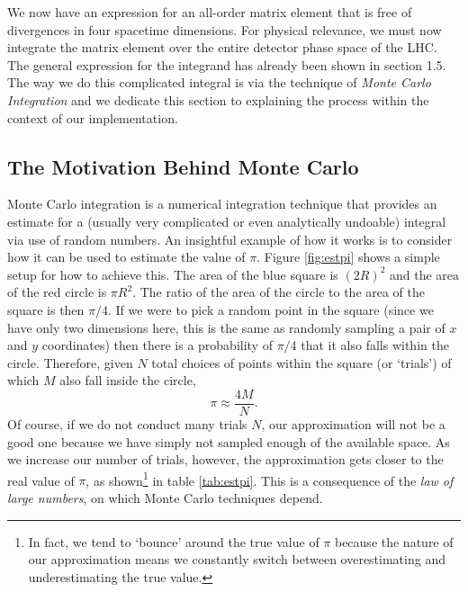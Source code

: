 We now have an expression for an all-order matrix element that is free of divergences in four spacetime dimensions. For physical relevance, we must now integrate the matrix element over the entire detector phase space of the LHC. The general expression for the integrand has already been shown in section 1.5. The way we do this complicated integral is via the technique of \emph{Monte Carlo Integration} and we dedicate this section to explaining the process within the context of our implementation.

\subsection{The Motivation Behind Monte Carlo}
Monte Carlo integration is a numerical integration technique that provides an estimate for a (usually very complicated or even analytically undoable) integral via use of random numbers. An insightful example of how it works is to consider how it can be used to estimate the value of $\pi$. Figure \ref{fig:estpi} shows a simple setup for how to achieve this. The area of the blue square is $(2R)^2$ and the area of the red circle is $\pi R^2$. The ratio of the area of the circle to the area of the square is then $\pi/4$. If we were to pick a random point in the square (since we have only two dimensions here, this is the same as randomly sampling a pair of $x$ and $y$ coordinates) then there is a probability of $\pi/4$ that it also falls within the circle. Therefore, given $N$ total choices of points within the square (or `trials') of which $M$ also fall inside the circle,
\begin{equation}
\pi \approx \frac{4M}{N}.
\end{equation} 
Of course, if we do not conduct many trials $N$, our approximation will not be a good one because we have simply not sampled enough of the available space. As we increase our number of trials, however, the approximation gets closer to the real value of $\pi$, as shown\footnote{In fact, we tend to `bounce' around the true value of $\pi$ because the nature of our approximation means we constantly switch between overestimating and underestimating the true value.} in table \ref{tab:estpi}. This is a consequence of the \emph{law of large numbers}, on which Monte Carlo techniques depend. 


